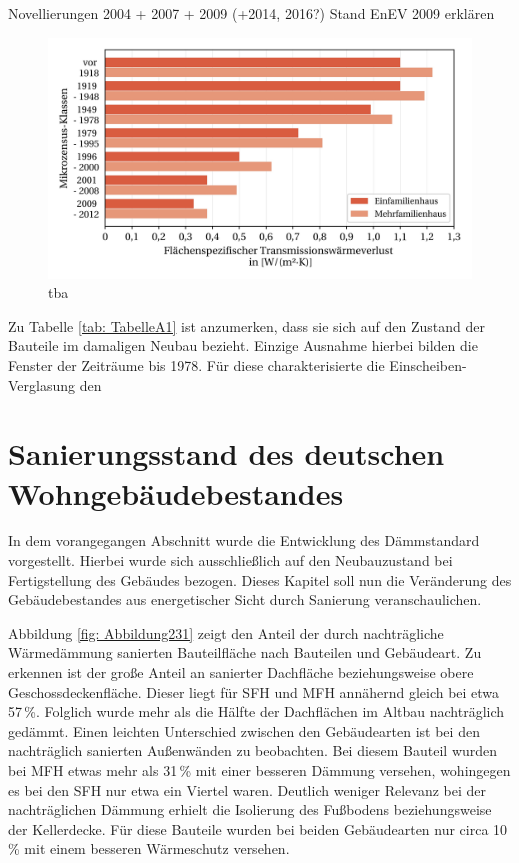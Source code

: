Novellierungen 2004 + 2007 + 2009 (+2014, 2016?)
Stand EnEV 2009 erklären

\begin{figure}[H]
	\centering
		\includegraphics{Pictures/TransmissionswaermekoeffizientBaujahr.jpg}
	\caption{tba}
	\label{fig: Abbildung221} 
\end{figure}

Zu Tabelle \ref{tab: TabelleA1} ist anzumerken, dass sie sich auf den Zustand der Bauteile im damaligen Neubau bezieht. 
Einzige Ausnahme hierbei bilden die Fenster der Zeiträume bis 1978. 
Für diese charakterisierte die Einscheiben-Verglasung den





\section{Sanierungsstand des deutschen Wohngebäudebestandes}
\label{sec:Sektion 23}

In dem vorangegangen Abschnitt wurde die Entwicklung des Dämmstandard vorgestellt. 
Hierbei wurde sich ausschließlich auf den Neubauzustand bei Fertigstellung des Gebäudes bezogen.
Dieses Kapitel soll nun die Veränderung des Gebäudebestandes aus energetischer Sicht durch Sanierung veranschaulichen.

Abbildung \ref{fig: Abbildung231} zeigt den Anteil der durch nachträgliche Wärmedämmung sanierten Bauteilfläche nach Bauteilen und Gebäudeart.
Zu erkennen ist der große Anteil an sanierter Dachfläche beziehungsweise obere Geschossdeckenfläche.
Dieser liegt für SFH und MFH annähernd gleich bei etwa 57\,\%.
Folglich wurde mehr als die Hälfte der Dachflächen im Altbau nachträglich gedämmt.
Einen leichten Unterschied zwischen den Gebäudearten ist bei den nachträglich sanierten Außenwänden zu beobachten. 
Bei diesem Bauteil wurden bei MFH etwas mehr als 31\,\% mit einer besseren Dämmung versehen, wohingegen es bei den SFH nur etwa ein Viertel waren.
Deutlich weniger Relevanz bei der nachträglichen Dämmung erhielt die Isolierung des Fußbodens beziehungsweise der Kellerdecke. 
Für diese Bauteile wurden bei beiden Gebäudearten nur circa 10\,\% mit einem besseren Wärmeschutz versehen. 

